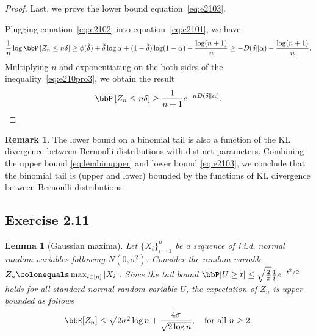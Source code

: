 \documentclass[11pt]{article}
\newcommand{\off}[1]{\left[#1\right]}
\theoremstyle{plain}
\newtheorem{lem}{Lemma}
\theoremstyle{definition}
\newtheorem{rmk}{Remark}
\begin{document}
\begin{proof}
	\vspace{0.2cm}
	Last, we prove the lower bound equation~\eqref{eq:e2103}.
	
	\vspace{0.2cm}
	Plugging equation~\eqref{eq:e2102} into equation~\eqref{eq:e2101}, we have
	\begin{equation}\label{eq:e210pro3}
		\frac{1}{n} \log \bbP \off{Z_n \leq n\delta} \geq \phi(\tilde \delta) + \tilde \delta \log \alpha + (1 - \tilde \delta ) \log (1-\alpha) - \frac{\log(n+1)}{n} \geq -D(\delta \Vert \alpha ) - \frac{\log(n+1)}{n}.
	\end{equation}
	Multiplying $n$ and exponentiating on the both sides of the inequality~\eqref{eq:e210pro3}, we obtain the result
	\begin{equation}
		\bbP \off{Z_n \leq n\delta} \geq \frac{1}{n+1} e^{-nD(\delta \Vert \alpha)}.
	\end{equation}
\end{proof}

\begin{rmk}
	The lower bound on a binomial tail is also a function of the KL divergence between Bernoulli distributions with distinct parameters. Combining the upper bound \eqref{eq:lembinupper} and lower bound \eqref{eq:e2103}, we conclude that the binomial tail is (upper and lower) bounded by the functions of  KL divergence between Bernoulli distributions.
\end{rmk}


\subsection{Exercise 2.11}
\begin{lem}[Gaussian maxima]
Let $\{X_i\}_{i=1}^n$ be a sequence of i.i.d. normal random variables following $N(0,\sigma^2)$. Consider the random variable $Z_n \colonequals \max_{i\in[n]} |X_i|$. Since the tail bound $\bbP[U \geq t] \leq \sqrt{\frac{2}{\pi}} \frac{1}{t} e^{-t^2 /2}$ holds for all standard normal random variable $U$, the expectation of $Z_n$ is upper bounded as follows
\begin{equation}\label{eq:e2111}
	\bbE[Z_n] \leq \sqrt{2 \sigma^2 \log n} + \frac{4\sigma}{\sqrt{2 \log n}}, \quad \text{for all } n\geq 2.
\end{equation}
\iffalse
The lower bound of $\bbE[Z_n] $ is
\begin{equation}\label{eq:e2112}
	\bbE[Z_n] \geq (1- 1/e) \sqrt{2\sigma^2 \log n} , \quad \text{for all }n \geq 5.
\end{equation}
\fi
	
\end{lem}
\end{document}
